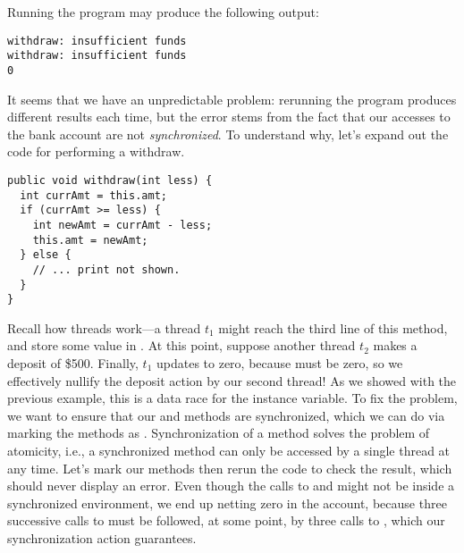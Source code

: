 Running the program may produce the following output:

\par{\footnotesize
\begin{verbatim}
withdraw: insufficient funds
withdraw: insufficient funds
0
\end{verbatim}
}

It seems that we have an unpredictable problem: rerunning the program produces different results each time, but the error stems from the fact that our accesses to the bank account are not \textit{synchronized}. To understand why, let's expand out the code for performing a withdraw.

\par{\footnotesize
\begin{verbatim}
public void withdraw(int less) {
  int currAmt = this.amt;
  if (currAmt >= less) {
    int newAmt = currAmt - less;
    this.amt = newAmt;
  } else {
    // ... print not shown.
  }
}
\end{verbatim}
}

\begin{sloppypar}{Recall how threads work---a thread $t_1$ might reach the third line of this method, and store some value in . At this point, suppose another thread $t_2$ makes a deposit of \$500. Finally, $t_1$ updates  to zero, because  must be zero, so we effectively nullify the deposit action by our second thread! As we showed with the previous example, this is a data race for the  instance variable. To fix the problem, we want to ensure that our  and  methods are synchronized, which we can do via marking the methods as . Synchronization of a method solves the problem of atomicity, i.e., a synchronized method can only be accessed by a single thread at any time. Let's mark our methods then rerun the code to check the result, which should never display an error. Even though the calls to  and  might not be inside a synchronized environment, we end up netting zero in the account, because three successive calls to  must be followed, at some point, by three calls to , which our synchronization action guarantees.}
\end{sloppypar}


